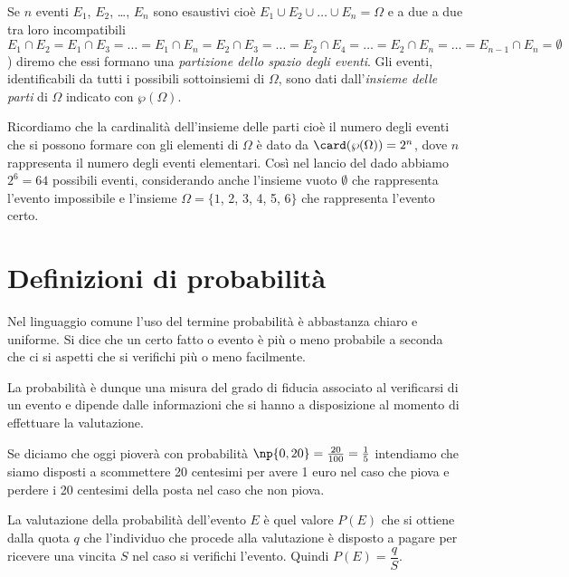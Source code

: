 \begin{definizione}
Se $n$ eventi $E_1$, $E_2$, \ldots, $E_n$ sono esaustivi cioè $E_1 \cup E_2 \cup \dots{} \cup E_n=\Omega$ e a due a due tra loro incompatibili $E_1\cap E_2 = E_1 \cap E_3 = \ldots = E_1 \cap E_n = E_2 \cap E_3 = \ldots = E_2 \cap E_4 = \ldots = E_2 \cap E_n = \ldots = E_{n-1}\cap E_n=\emptyset$) diremo che essi formano una \emph{partizione dello spazio degli eventi}. Gli eventi, identificabili da tutti i possibili sottoinsiemi di $\Omega$, sono dati dall'\emph{insieme delle parti} di $\Omega$ indicato con $\wp (\Omega).$
\end{definizione}

Ricordiamo che la cardinalità dell'insieme delle parti cioè il numero degli eventi che si possono formare con gli elementi di $\Omega$ è dato da $\card(\wp(\Omega ))=2^n$, dove $n$ rappresenta il numero degli eventi elementari. Così nel lancio del dado abbiamo $2^6=64$ possibili eventi, considerando anche l'insieme vuoto $\emptyset$ che rappresenta l'evento impossibile e l'insieme $\Omega =\{1$, 2, 3, 4, 5, $6\}$ che rappresenta l'evento certo.

\vspazio\ovalbox{\risolvii \ref{ese:9.1}, \ref{ese:9.2}, \ref{ese:9.3}, \ref{ese:9.4}}

\section{Definizioni di probabilità}

Nel linguaggio comune l'uso del termine probabilità è abbastanza chiaro e uniforme. Si dice che un certo fatto o evento è più o meno probabile a seconda che ci si aspetti che si verifichi più o meno facilmente.

La probabilità è dunque una misura del grado di fiducia associato al verificarsi di un evento e dipende dalle informazioni che si hanno a disposizione al momento di effettuare la valutazione.

Se diciamo che oggi pioverà con probabilità $\np{0,20}=\frac{20}{100}=\frac 1 5$ intendiamo che siamo disposti a scommettere 20 centesimi per avere 1 euro nel caso che piova e perdere i 20 centesimi della posta nel caso che non piova.

\begin{definizione}
La valutazione della probabilità dell'evento $E$ è quel valore $P(E)$ che si ottiene dalla quota $q$ che l'individuo che procede alla valutazione è disposto a pagare per ricevere una vincita $S$ nel caso si verifichi l'evento. Quindi $P(E)=\dfrac q S$.
\end{definizione}

